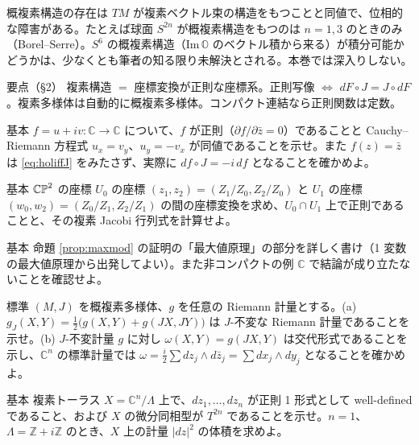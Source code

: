 \begin{rem}[概複素構造の存在]\label{rem:ac}
概複素構造の存在は $TM$ が複素ベクトル束の構造をもつことと同値で、位相的な障害がある。たとえば球面 $S^{2n}$ が概複素構造をもつのは $n=1,3$ のときのみ（Borel--Serre）\tQ。$S^6$ の概複素構造（$\mathrm{Im}\,\mathbb O$ のベクトル積から来る）が積分可能かどうかは、少なくとも筆者の知る限り未解決とされる\tQ。本巻では深入りしない。
\end{rem}

\begin{keybox}{要点（§2）}
複素構造 $=$ 座標変換が正則な座標系。正則写像 $\iff$ $dF\circ J=J\circ dF$。複素多様体は自動的に概複素多様体。コンパクト連結なら正則関数は定数。
\end{keybox}

\begin{prob}{基本}\label{p:cr}
$f=u+iv:\mathbb C\to\mathbb C$ について、$f$ が正則（$\partial f/\partial\bar z=0$）であることと Cauchy--Riemann 方程式 $u_x=v_y$、$u_y=-v_x$ が同値であることを示せ。また $f(z)=\bar z$ は \eqref{eq:holiffJ} をみたさず、実際に $df\circ J=-i\,df$ となることを確かめよ。
\end{prob}
\begin{prob}{基本}\label{p:pn}
$\mathbb{CP}^2$ の座標 $U_0$ の座標 $(z_1,z_2)=(Z_1/Z_0,Z_2/Z_0)$ と $U_1$ の座標 $(w_0,w_2)=(Z_0/Z_1,Z_2/Z_1)$ の間の座標変換を求め、$U_0\cap U_1$ 上で正則であることと、その複素 Jacobi 行列式を計算せよ。
\end{prob}
\begin{prob}{基本}\label{p:compactconst}
命題 \ref{prop:maxmod} の証明の「最大値原理」の部分を詳しく書け（1 変数の最大値原理から出発してよい）。また非コンパクトの例 $\mathbb C$ で結論が成り立たないことを確認せよ。
\end{prob}
\begin{prob}{標準}\label{p:herm}
$(M,J)$ を概複素多様体、$g$ を任意の Riemann 計量とする。(a) $g_J(X,Y)=\frac12\big(g(X,Y)+g(JX,JY)\big)$ は $J$-不変な Riemann 計量であることを示せ。(b) $J$-不変計量 $g$ に対し $\omega(X,Y)=g(JX,Y)$ は交代形式であることを示し、$\mathbb C^n$ の標準計量では $\omega=\frac i2\sum dz_j\wedge d\bar z_j=\sum dx_j\wedge dy_j$ となることを確かめよ。
\end{prob}
\begin{prob}{基本}\label{p:torus1}
複素トーラス $X=\mathbb C^n/\Lambda$ 上で、$dz_1,\dots,dz_n$ が正則 1 形式として well-defined であること、および $X$ の微分同相型が $T^{2n}$ であることを示せ。$n=1$、$\Lambda=\mathbb Z+i\mathbb Z$ のとき、$X$ 上の計量 $|dz|^2$ の体積を求めよ。
\end{prob}

